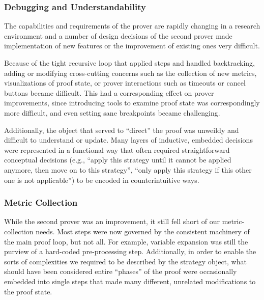 		\subsubsection{Debugging and Understandability}	%

The capabilities and requirements of the prover are rapidly changing in a research environment and a number of design decisions of the second prover made implementation of new features or the improvement of existing ones very difficult.

Because of the tight recursive loop that applied steps and handled backtracking, adding or modifying cross-cutting concerns such as the collection of new metrics, visualizations of proof state, or prover interactions such as timeouts or cancel buttons became difficult.  This had a corresponding effect on prover improvements, since introducing tools to examine proof state was correspondingly more difficult, and even setting sane breakpoints became challenging.

Additionally, the object that served to ``direct'' the proof was unweildy and difficult to understand or update.  Many layers of inductive, embedded decisions were represented in a functional way that often required straightforward conceptual decisions (e.g., ``apply this strategy until it cannot be applied anymore, then move on to this strategy'', ``only apply this strategy if this other one is not applicable'') to be encoded in counterintuitive ways.

		\subsubsection{Metric Collection}	%

While the second prover was an improvement, it still fell short of our metric-collection needs.  Most steps were now governed by the consistent machinery of the main proof loop, but not all.  For example, variable expansion was still the purview of a hard-coded pre-processing step.  Additionally, in order to enable the sorts of complexities we required to be described by the strategy object, what should have been considered entire ``phases'' of the proof were occasionally embedded into single steps that made many different, unrelated modifications to the proof state.

